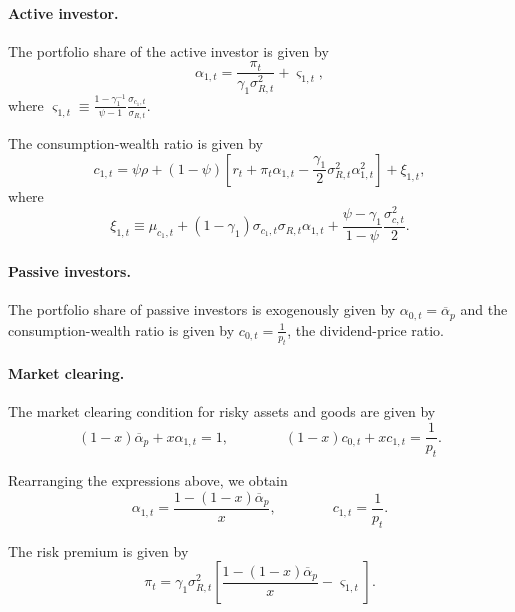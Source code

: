 \documentclass[11pt,english]{article}
\begin{document}
\paragraph{Active investor.} The portfolio share of the active investor is given by
\begin{equation}
    \alpha_{1,t} = \frac{\pi_t}{\gamma_1 \sigma_{R,t}^2} + \varsigma_{1,t},
\end{equation}
where $\varsigma_{1,t} \equiv \frac{1-\gamma_1^{-1}}{\psi-1} \frac{\sigma_{c_1,t}}{\sigma_{R,t}}$.

The consumption-wealth ratio is given by
\begin{equation}
    c_{1,t} = \psi \rho + (1-\psi) \left[ r_t + \pi_t \alpha_{1,t} - \frac{\gamma_1}{2} \sigma_{R,t}^2 \alpha_{1,t}^2 \right] + \xi_{1,t},
\end{equation}
where
\begin{equation}
    \xi_{1,t} \equiv \mu_{c_1,t} + (1-\gamma_1) \sigma_{c_1,t} \sigma_{R,t} \alpha_{1,t} + \frac{\psi-\gamma_1}{1-\psi} \frac{\sigma_{c,t}^2}{2}.
\end{equation}

\paragraph{Passive investors.} The portfolio share of passive investors is exogenously given by $\alpha_{0,t} = \overline{\alpha}_{p}$ and the consumption-wealth ratio is given by
$c_{0,t} = \frac{1}{p_t}$, the dividend-price ratio. 

\paragraph{Market clearing.} The market clearing condition for risky assets and goods are given by
\begin{equation}
    (1-x) \overline{\alpha}_p +x \alpha_{1,t} = 1, \qquad \qquad 
    (1-x) c_{0,t}+ x c_{1,t} = \frac{1}{p_t}.
\end{equation}

Rearranging the expressions above, we obtain
\begin{equation}
    \alpha_{1,t} = \frac{1 - (1-x) \overline{\alpha}_p}{x}, \qquad \qquad c_{1,t} = \frac{1}{p_t}.
\end{equation}

The risk premium is given by
\begin{equation}
    \pi_t = \gamma_1 \sigma_{R,t}^2 \left[ \frac{1-(1-x) \overline{\alpha}_p}{x} - \varsigma_{1,t} \right].
\end{equation}
\end{document}
